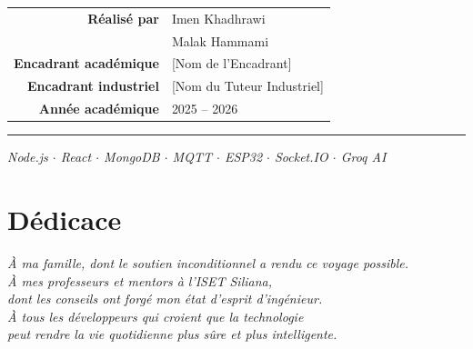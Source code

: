 \documentclass[12pt,a4paper,oneside]{report}
\begin{document}
\begin{titlepage}
\vspace{0.8cm}

\begin{tabular}{r@{\hspace{0.6em}:\hspace{0.8em}}l}
  \color{espritblue}\textbf{Réalisé par}
    & Imen Khadhrawi \\[3pt]
    & Malak Hammami \\[8pt]
  \color{espritblue}\textbf{Encadrant académique}
    & [Nom de l'Encadrant] \\[8pt]
  \color{espritblue}\textbf{Encadrant industriel}
    & [Nom du Tuteur Industriel] \\[8pt]
  \color{espritblue}\textbf{Année académique}
    & 2025 -- 2026 \\
\end{tabular}

\vspace{1.2cm}

{\color{espritgold}\rule{\textwidth}{0.8pt}}

\vspace{0.4cm}

{\small\color{gray}
\textit{Node.js \(\cdot\) React \(\cdot\) MongoDB \(\cdot\) MQTT \(\cdot\) ESP32 \(\cdot\) Socket.IO \(\cdot\) Groq AI}
}
\end{titlepage}

\setcounter{page}{1}

\chapter*{Dédicace}
\begin{center}
\vspace{2cm}
{\large\itshape
À ma famille, dont le soutien inconditionnel a rendu ce voyage possible.\\[0.5cm]
À mes professeurs et mentors à l'ISET Siliana,\\
dont les conseils ont forgé mon état d'esprit d'ingénieur.\\[0.5cm]
À tous les développeurs qui croient que la technologie\\
peut rendre la vie quotidienne plus sûre et plus intelligente.
}
\end{center}
\end{document}
